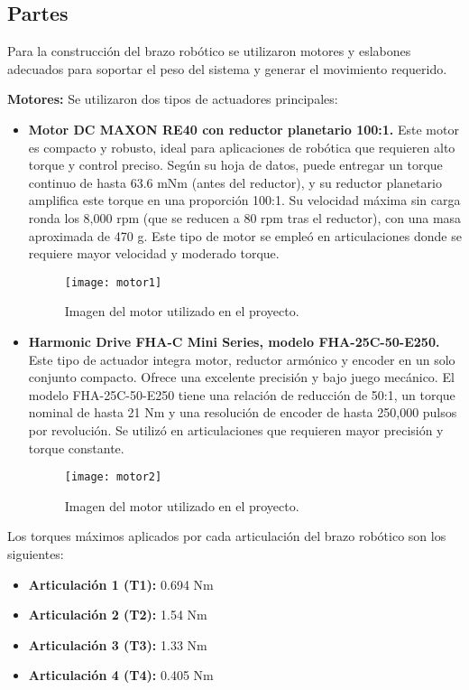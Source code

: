 \subsection{Partes} \label{subsec:partes} 

Para la construcción del brazo robótico se utilizaron motores y eslabones adecuados para soportar el peso del sistema y generar el movimiento requerido.

\textbf{Motores:} Se utilizaron dos tipos de actuadores principales:

\begin{itemize}
	\item \textbf{Motor DC MAXON RE40 con reductor planetario 100:1.} Este motor es compacto y robusto, ideal para aplicaciones de robótica que requieren alto torque y control preciso. Según su hoja de datos, puede entregar un torque continuo de hasta 63.6 mNm (antes del reductor), y su reductor planetario amplifica este torque en una proporción 100:1. Su velocidad máxima sin carga ronda los 8,000 rpm (que se reducen a 80 rpm tras el reductor), con una masa aproximada de 470 g. Este tipo de motor se empleó en articulaciones donde se requiere mayor velocidad y moderado torque.
	\begin{figure}[H]
		\centering
		\texttt{[image: motor1]}
		\caption{Imagen del motor utilizado en el proyecto.}
		\label{fig:motor1}
	\end{figure}
	
	
	\item \textbf{Harmonic Drive FHA-C Mini Series, modelo FHA-25C-50-E250.} Este tipo de actuador integra motor, reductor armónico y encoder en un solo conjunto compacto. Ofrece una excelente precisión y bajo juego mecánico. El modelo FHA-25C-50-E250 tiene una relación de reducción de 50:1, un torque nominal de hasta 21 Nm y una resolución de encoder de hasta 250,000 pulsos por revolución. Se utilizó en articulaciones que requieren mayor precisión y torque constante.
	
		\begin{figure}[H]
		\centering
		\texttt{[image: motor2]}
		\caption{Imagen del motor utilizado en el proyecto.}
		\label{fig:motor2}
	\end{figure}
\end{itemize}

Los torques máximos aplicados por cada articulación del brazo robótico son los siguientes:

\begin{itemize}
	\item \textbf{Articulación 1 (T1):} 0.694 Nm
	\item \textbf{Articulación 2 (T2):} 1.54 Nm
	\item \textbf{Articulación 3 (T3):} 1.33 Nm
	\item \textbf{Articulación 4 (T4):} 0.405 Nm
\end{itemize}

